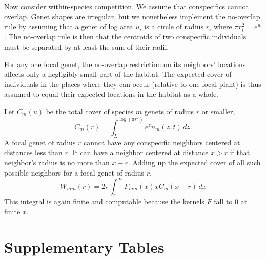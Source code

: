 \documentclass[11pt]{article}
\begin{document}
Now consider within-species competition. We assume that conspecifics cannot overlap. Genet shapes are irregular, but we 
nonetheless implement the no-overlap rule by assuming that a genet of log area $u_i$ is a 
circle of radius $r_i$ where $\pi r_i^2 = e^{u_i}$. The no-overlap rule is then that the centroids of two conspecific individuals 
must be separated by at least the sum of their radii. 

For any one focal genet, the no-overlap restriction on its neighbors' locations affects 
only a negligibly small part of the habitat. The expected cover of individuals in the places
where they can occur (relative to one focal plant) is thus assumed to equal their expected locations
in the habitat as a whole. 
 
Let $C_m(u)$ be the total cover of species $m$ genets of radius $r$ or smaller, 
\begin{equation}
C_m(r) = \int_L^{\log(\pi r^2)}{\! \! \! e^z n_m(z,t) \, dz} .
\label{eqn:cm}
\end{equation}
A focal genet of radius $r$ cannot have any conspecific neighbors centered 
at distances less than $r$. It can have a neighbor centered at distance $x>r$ if that neighbor's
radius is no more than $x-r$. Adding up the expected cover of all such possible neighbors
for a focal genet of radius $r$,    
\begin{equation}
W_{mm}(r) = 2 \pi \int_r^{\infty}F_{mm}(x) x C_m(x-r) \, dx
\label{eqn:wbarmr} 
\end{equation}
This integral is again finite and computable because the kernels $F$ fall to 0 at finite $x$. 

\renewcommand{\refname}{Literature cited}



\clearpage 
\newpage  

\section{Supplementary Tables} 
\end{document}
